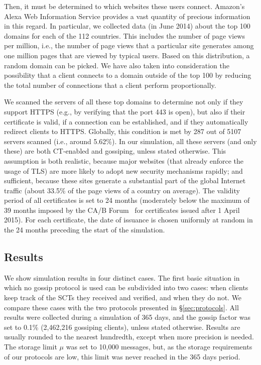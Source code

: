 Then, it must be determined to which websites these users connect. Amazon's Alexa
Web Information Service provides a vast quantity of precious information in this
regard. In particular, we collected data (in June 2014) about the top 100 domains for each of
the 112 countries. This includes the number of page views per million, i.e., the
number of page views that a particular site generates among one million pages
that are viewed by typical users. Based on this distribution, a random domain can be
picked. We have also taken into consideration the
possibility that a client connects to a domain outside of the
top 100 by reducing the total number of connections that a client perform
proportionally.

We scanned the servers of all these top domains to determine not only if they support
HTTPS (e.g., by verifying that the port 443 is open), but also if their certificate is valid,
if a connection can be established, and if they automatically redirect clients
to HTTPS. Globally, this condition is met by 287 out of 5107 servers scanned
(i.e., around 5.62\%). In our simulation, all these servers (and only these) are
both CT-enabled and gossiping, unless stated otherwise. This assumption is both realistic, because
major websites (that already enforce the usage of TLS) are more likely to adopt new security
mechanisms rapidly; and sufficient, because these sites generate a substantial
part of the global Internet traffic (about 33.5\% of the page views of a country
on average).
The validity period of all certificates is set to 24 months (moderately below
the maximum of 39 months imposed by the CA/B Forum~\cite{CABForum} for certificates
issued after 1 April 2015). For each certificate, the date of issuance is chosen
uniformly at random in the 24 months preceding the start of the simulation.

\subsection{Results}\label{sec:simulation_results}

We show simulation results in four distinct cases. The first basic situation
in which no gossip protocol is used can be subdivided into two cases: when clients keep
track of the SCTs they received and verified, and when they do not. We 
compare these cases with the two protocols presented in \S\ref{sec:protocols}. All
results were collected during a simulation of 365 days, and the
gossip factor was set to 0.1\% (2,462,216 gossiping clients), unless stated otherwise.
Results are usually rounded to the nearest hundredth, except when more precision is needed.
The storage limit $\mu$ was set to 10,000 messages, but, as the storage requirements of
our protocols are low, this limit was never reached in the 365 days period.

